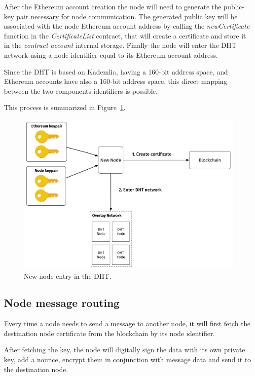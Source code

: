 After the Ethereum account creation the node will need to generate the public-key pair necessary for node communication.
The generated public key will be associated with the node Ethereum account address by calling the \textit{newCertificate} function in the \textit{CertificateList} contract, that will create a certificate and store it in the \textit{contract account} internal storage.
Finally the node will enter the DHT network using a node identifier equal to its Ethereum account address.

Since the DHT is based on Kademlia, having a 160-bit address space, and Ethereum accounts have also a 160-bit address space, this direct mapping between the two components identifiers is possible.

This process is summarized in Figure~\ref{fig:new-node}.

\begin{figure}
    \includegraphics[width=\linewidth]{Figures/new-node.png}
    \caption{New node entry in the DHT.}
    \label{fig:new-node}
\end{figure}

\subsection{Node message routing}
Every time a node needs to send a message to another node, it will first fetch the destination node certificate from the blockchain by its node identifier.

After fetching the key, the node will digitally sign the data with its own private key, add a nounce, encrypt them in conjunction with message data and send it to the destination node.

